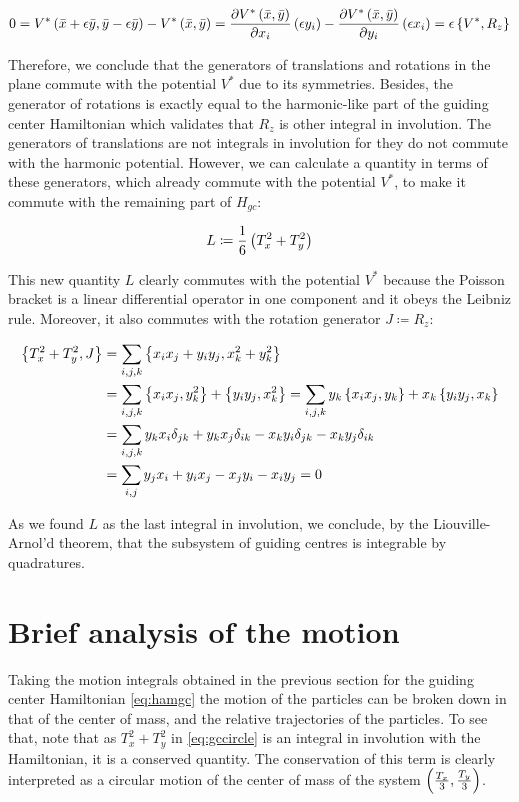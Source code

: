 \begin{equation*}
0={V^*\left( \bar{x} +\epsilon \bar{y}, \bar{y} - \epsilon \bar{y} \right)-V^*\left( \bar{x},\bar{y} \right)}
= \frac{\partial V^*\left( \bar{x},\bar{y} \right)}{\partial x_i} \left( \epsilon y_i \right) -                                \frac{\partial V^*\left( \bar{x},\bar{y} \right)}{\partial y_i} \left( \epsilon x_i \right)                                        = \epsilon \left\lbrace V^*, R_z \right\rbrace
\end{equation*}

Therefore, we conclude that the generators of translations and rotations in the plane commute with the potential $V^*$ due to its symmetries. Besides, the generator of rotations is exactly equal to the harmonic-like part of the guiding center Hamiltonian which validates that $R_z$ is other integral in involution. The generators of translations are not integrals in involution for they do not commute with the harmonic potential. However, we can calculate a quantity in terms of these generators, which already commute with the potential $V^*$, to make it commute with the remaining part of $H_{gc}$: 

\begin{equation}
L \coloneqq \frac{1}{6}\left( T_x^2 + T_y^2 \right)
\label{eq:gccircle}
\end{equation}

This new quantity $L$ clearly commutes with the potential $V^*$ because the Poisson bracket is  a linear differential operator in one component and it obeys the Leibniz rule. Moreover, it also commutes with the rotation generator $J \coloneqq R_z$:

\begin{align*}
\left\lbrace T_x^2+ T_y^2,  J \right\rbrace &= \sum_{i,j,k} \left\lbrace x_ix_j + y_iy_j, x_k^2 + y_k^2 \right\rbrace\\
&= \sum_{i,j,k}  \left\lbrace x_ix_j, y_k^2 \right\rbrace + \left\lbrace y_iy_j, x_k^2 \right\rbrace = \sum_{i,j,k} y_k \left\lbrace x_ix_j, y_k \right\rbrace + x_k \left\lbrace y_iy_j, x_k \right\rbrace\\
&= \sum_{i,j,k} y_kx_i\delta_{jk}+y_kx_j\delta_{ik} - x_ky_i\delta_{jk}- x_ky_j\delta_{ik}\\
&= \sum_{i,j} y_jx_i + y_ix_j - x_jy_i - x_iy_j = 0
\end{align*}

As we found $L$ as the last integral in involution, we conclude, by the Liouville-Arnol'd theorem, that the subsystem of guiding centres is integrable by quadratures.\\

\section{Brief analysis of the motion}
Taking the motion integrals obtained in the previous section for the guiding center Hamiltonian \eqref{eq:hamgc} the motion of the particles can be broken down in that of the center of mass, and the relative trajectories of the particles. To see that, note that as $T_x^2 + T_y^2$ in \eqref{eq:gccircle} is an integral in involution with the Hamiltonian, it is a conserved quantity. The conservation of this term is clearly interpreted as a circular motion of the center of mass of the system $\left( \frac{T_x}{3},\frac{T_y}{3} \right)$.\\

